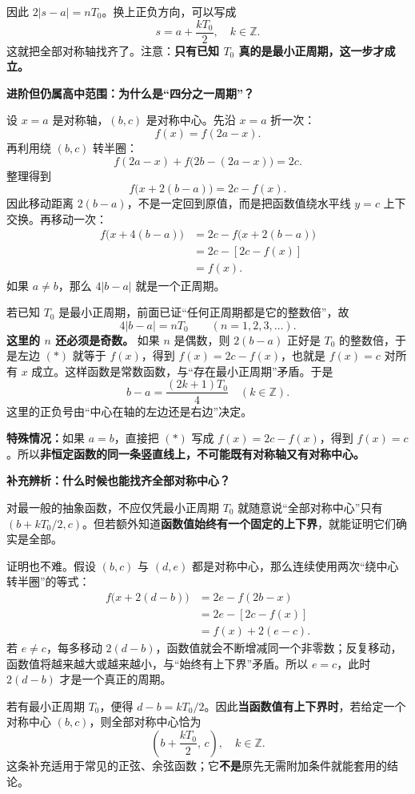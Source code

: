 \begin{proofbox}
因此 $2|s-a|=nT_0$。换上正负方向，可以写成
\[
\boxed{s=a+\frac{kT_0}{2},\quad k\in\mathbb Z}.
\]
这就把全部对称轴找齐了。注意：\textbf{只有已知 $T_0$ 真的是最小正周期，这一步才成立。}

\medskip
\end{proofbox}\clearpage\begin{proofbox}\textbf{\textcolor{CProof}{进阶但仍属高中范围：为什么是“四分之一周期”？}}



设 $x=a$ 是对称轴，$(b,c)$ 是对称中心。先沿 $x=a$ 折一次：
\[
f(x)=f(2a-x).
\]
再利用绕 $(b,c)$ 转半圈：
\[
f(2a-x)+f\bigl(2b-(2a-x)\bigr)=2c.
\]
整理得到
\[
\boxed{f\bigl(x+2(b-a)\bigr)=2c-f(x).}\tag{$*$}
\]
因此移动距离 $2(b-a)$，不是一定回到原值，而是把函数值绕水平线 $y=c$ 上下交换。再移动一次：
\[
\begin{aligned}
f\bigl(x+4(b-a)\bigr)
&=2c-f\bigl(x+2(b-a)\bigr)\\
&=2c-[2c-f(x)]\\
&=f(x).
\end{aligned}
\]
如果 $a\ne b$，那么 $4|b-a|$ 就是一个正周期。

若已知 $T_0$ 是最小正周期，前面已证“任何正周期都是它的整数倍”，故
\[
4|b-a|=nT_0\qquad(n=1,2,3,\ldots).
\]
\textbf{这里的 $n$ 还必须是奇数。} 如果 $n$ 是偶数，则 $2(b-a)$ 正好是 $T_0$ 的整数倍，于是左边 $(*)$ 就等于 $f(x)$，得到 $f(x)=2c-f(x)$，也就是 $f(x)=c$ 对所有 $x$ 成立。这样函数是常数函数，与“存在最小正周期”矛盾。于是
\[
\boxed{b-a=\frac{(2k+1)T_0}{4}\quad(k\in\mathbb Z).}
\]
这里的正负号由“中心在轴的左边还是右边”决定。

\textbf{特殊情况：}如果 $a=b$，直接把 $(*)$ 写成 $f(x)=2c-f(x)$，得到 $f(x)=c$。所以\textbf{非恒定函数的同一条竖直线上，不可能既有对称轴又有对称中心。}

\medskip
\end{proofbox}\clearpage\begin{proofbox}\textbf{\textcolor{CProof}{补充辨析：什么时候也能找齐全部对称中心？}}



对最一般的抽象函数，不应仅凭最小正周期 $T_0$ 就随意说“全部对称中心”只有 $(b+kT_0/2,c)$。但若额外知道\textbf{函数值始终有一个固定的上下界}，就能证明它们确实是全部。

证明也不难。假设 $(b,c)$ 与 $(d,e)$ 都是对称中心，那么连续使用两次“绕中心转半圈”的等式：
\[
\begin{aligned}
f\bigl(x+2(d-b)\bigr)
&=2e-f(2b-x)\\
&=2e-[2c-f(x)]\\
&=f(x)+2(e-c).
\end{aligned}
\]
若 $e\ne c$，每多移动 $2(d-b)$，函数值就会不断增减同一个非零数；反复移动，函数值将越来越大或越来越小，与“始终有上下界”矛盾。所以 $e=c$，此时 $2(d-b)$ 才是一个真正的周期。

若有最小正周期 $T_0$，便得 $d-b=kT_0/2$。因此\textbf{当函数值有上下界时}，若给定一个对称中心 $(b,c)$，则全部对称中心恰为
\[
\boxed{\left(b+\frac{kT_0}{2},\,c\right),\quad k\in\mathbb Z.}
\]
这条补充适用于常见的正弦、余弦函数；它\textbf{不是}原先无需附加条件就能套用的结论。
\end{proofbox}
